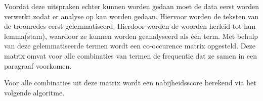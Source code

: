 Voordat deze uitspraken echter kunnen worden gedaan moet de data eerst worden verwerkt zodat er analyse op kan worden gedaan. Hiervoor worden de teksten van de troonredes eerst gelemmatiseerd. Hierdoor worden de woorden herleid tot hun lemma(stam), waardoor ze kunnen worden geanalyseerd als één term.  Met behulp van deze gelemmatiseerde termen wordt een co-occurence matrix opgesteld. Deze matrix omvat voor alle combinaties van termen  de frequentie dat ze samen in een paragraaf voorkomen. 

Voor alle combinaties uit deze matrix wordt een nabijheidsscore berekend via het volgende algoritme.  


